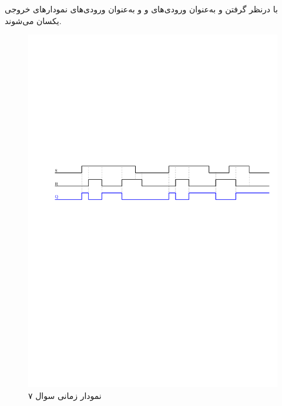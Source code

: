 

با درنظر گرفتن  و  به‌عنوان ورودی‌های  و  و  به‌عنوان ورودی‌های  نمودار‌های خروجی یکسان می‌شوند.



\begin{figure}[h]
	\centering
	\includegraphics[width=1\textwidth]{fig/Q7.pdf}
	\caption{نمودار زمانی سوال ۷}
	\label{Q6_Design}
\end{figure}

